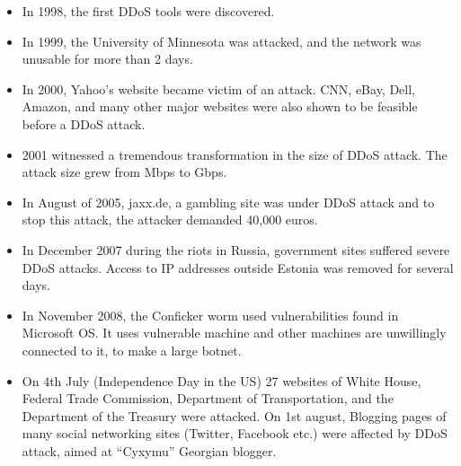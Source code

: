 \documentclass{ijitcs}
\begin{document}
\begin{itemize}
    \item In 1998, the first DDoS tools were discovered.
    \item In 1999, the University of Minnesota was attacked, and the network was unusable for more than 2 days.
    \item In 2000, Yahoo’s website became victim of an attack.  CNN, eBay, Dell, Amazon, and many other major websites were also shown to be feasible before a DDoS attack.
    \item 2001 witnessed a tremendous transformation in the size of DDoS attack. The attack size grew from Mbps to Gbps.
    \item In August of 2005, jaxx.de, a gambling site was under DDoS attack and to stop this attack, the attacker demanded 40,000 euros.
    \item In December 2007 during the riots in Russia, government sites suffered severe DDoS attacks. Access to IP addresses outside Estonia was removed for several days.
    \item In November 2008, the Conficker worm used vulnerabilities found in Microsoft OS. It uses vulnerable machine and other machines are unwillingly connected to it, to make a large botnet.
    \item On 4th July (Independence Day in the US) 27 websites of White House, Federal Trade Commission, Department of Transportation, and the Department of the Treasury were attacked. On 1st august, Blogging pages of many social networking sites (Twitter, Facebook etc.) were affected by DDoS attack, aimed at “Cyxymu” Georgian blogger.
\end{itemize}
\end{document}
